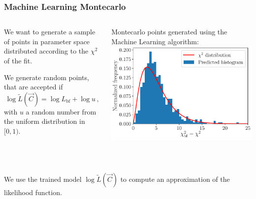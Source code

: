 \documentclass[mathserif, 10pt, dvipsnames]{beamer}
\begin{document}
\begin{frame}\frametitle{Machine Learning Montecarlo}
    \begin{columns}
        \begin{column}{0.5\textwidth}
We want to generate a sample of points in parameter space distributed according to the $\chi^2$ of the fit.

            We generate random points, that are accepted if
            $$\log \tilde{L}(\vec{C}) = \log L_\mathrm{bf} + \log u\,,$$
            with $u$ a random number from the uniform distribution in $[0,1)$. %
        \end{column}
        \begin{column}{0.5\textwidth}
            {\small Montecarlo points generated using the
                Machine Learning algorithm:}\\[0.2em]
            \includegraphics[width=\columnwidth]{figures/hist_xgb.pdf}
        \end{column}
    \end{columns}

    ~

    We use the trained model $\log\tilde{L}(\vec{C})$ to compute an approximation of the likelihood function.

\end{frame}
\end{document}
